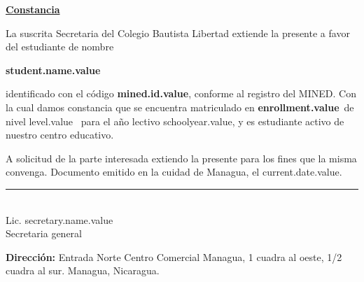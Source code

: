 \documentclass[12pt]{article}
\newcommand{\enrollmentName}{enrollment.value}
\newcommand{\levelName}{level.value}
\newcommand{\minedId}{mined.id.value}
\newcommand{\studentName}{student.name.value}
\newcommand{\schoolYear}{schoolyear.value}
\newcommand{\currentDate}{current.date.value}
\newcommand{\secretaryName}{secretary.name.value}
\begin{document}
    \begin{center}
        \underline{\textbf{\Large Constancia}}
    \end{center}
    
    La suscrita Secretaria del Colegio Bautista Libertad extiende la presente a favor del estudiante de nombre 
    \begin{center}
        \textbf{\studentName}
    \end{center}
    identificado con el código \textbf{\minedId}, conforme al registro del MINED.
    Con la cual damos constancia que se encuentra matriculado
    en \textbf{\enrollmentName}~de nivel \levelName~ para el año lectivo \schoolYear, y es estudiante activo de nuestro centro educativo.

    A solicitud de la parte interesada extiendo la presente para los fines que la misma convenga.
    Documento emitido en la cuidad de Managua, el \currentDate.
    
    \vfill
    \begin{center}
        \rule{5cm}{0.4pt}\\[1mm]
        Lic. \secretaryName\\
        Secretaria general
    \end{center}
    \vspace{2.5cm}

    \textbf{Dirección:} Entrada Norte Centro Comercial Managua, 1 cuadra al oeste, 1/2 cuadra al sur. Managua, Nicaragua.
\end{document}
